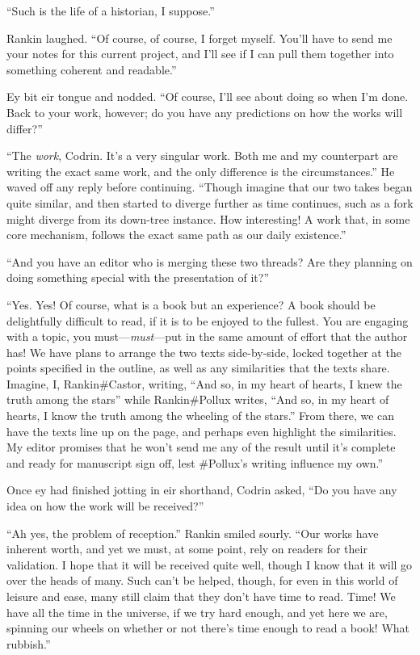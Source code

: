 ``Such is the life of a historian, I suppose.''

Rankin laughed. ``Of course, of course, I forget myself. You'll have to send me your notes for this current project, and I'll see if I can pull them together into something coherent and readable.''

Ey bit eir tongue and nodded. ``Of course, I'll see about doing so when I'm done. Back to your work, however; do you have any predictions on how the works will differ?''

``The \emph{work}, Codrin. It's a very singular work. Both me and my counterpart are writing the exact same work, and the only difference is the circumstances.'' He waved off any reply before continuing. ``Though imagine that our two takes began quite similar, and then started to diverge further as time continues, such as a fork might diverge from its down-tree instance. How interesting! A work that, in some core mechanism, follows the exact same path as our daily existence.''

``And you have an editor who is merging these two threads? Are they planning on doing something special with the presentation of it?''

``Yes. Yes! Of course, what is a book but an experience? A book should be delightfully difficult to read, if it is to be enjoyed to the fullest. You are engaging with a topic, you must---\emph{must}---put in the same amount of effort that the author has! We have plans to arrange the two texts side-by-side, locked together at the points specified in the outline, as well as any similarities that the texts share. Imagine, I, Rankin\#Castor, writing, ``And so, in my heart of hearts, I knew the truth among the stars'' while Rankin\#Pollux writes, ``And so, in my heart of hearts, I know the truth among the wheeling of the stars.'' From there, we can have the texts line up on the page, and perhaps even highlight the similarities. My editor promises that he won't send me any of the result until it's complete and ready for manuscript sign off, lest \#Pollux's writing influence my own.''

Once ey had finished jotting in eir shorthand, Codrin asked, ``Do you have any idea on how the work will be received?''

``Ah yes, the problem of reception.'' Rankin smiled sourly. ``Our works have inherent worth, and yet we must, at some point, rely on readers for their validation. I hope that it will be received quite well, though I know that it will go over the heads of many. Such can't be helped, though, for even in this world of leisure and ease, many still claim that they don't have time to read. Time! We have all the time in the universe, if we try hard enough, and yet here we are, spinning our wheels on whether or not there's time enough to read a book! What rubbish.''

